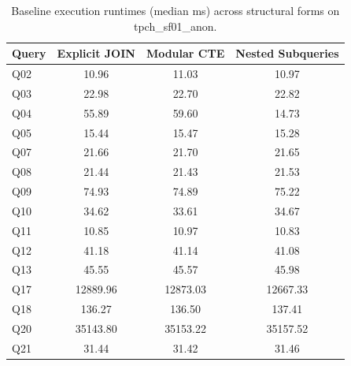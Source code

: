 \begin{table}[h]
\centering
\small
\begin{tabular}{lccc}
\toprule
\textbf{Query} & \textbf{Explicit JOIN} & \textbf{Modular CTE} & \textbf{Nested Subqueries} \\
\midrule
Q02 & 10.96 & 11.03 & 10.97 \\
Q03 & 22.98 & 22.70 & 22.82 \\
Q04 & 55.89 & 59.60 & 14.73 \\
Q05 & 15.44 & 15.47 & 15.28 \\
Q07 & 21.66 & 21.70 & 21.65 \\
Q08 & 21.44 & 21.43 & 21.53 \\
Q09 & 74.93 & 74.89 & 75.22 \\
Q10 & 34.62 & 33.61 & 34.67 \\
Q11 & 10.85 & 10.97 & 10.83 \\
Q12 & 41.18 & 41.14 & 41.08 \\
Q13 & 45.55 & 45.57 & 45.98 \\
Q17 & 12889.96 & 12873.03 & 12667.33 \\
Q18 & 136.27 & 136.50 & 137.41 \\
Q20 & 35143.80 & 35153.22 & 35157.52 \\
Q21 & 31.44 & 31.42 & 31.46 \\
\bottomrule
\end{tabular}
\caption{Baseline execution runtimes (median ms) across structural forms on tpch_sf01_anon.}
\label{tab:baseline_tpch_sf01_anon}
\end{table}
